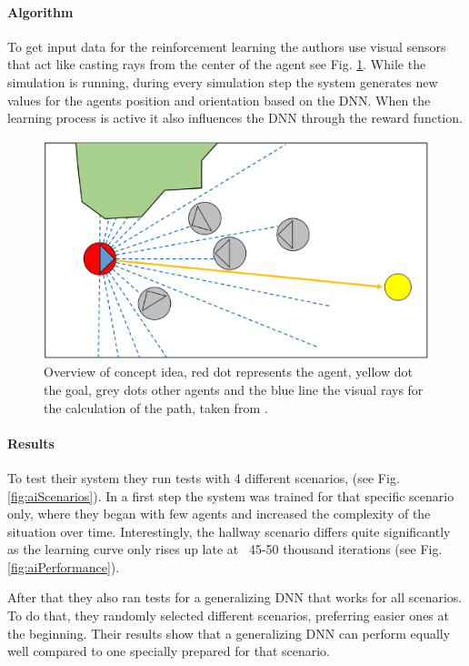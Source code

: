 \documentclass{acmsiggraph}               %
\begin{document}
\paragraph{Algorithm}
To get input data for the reinforcement learning the authors use visual sensors that act like casting rays from the center of the agent see Fig. \ref{fig:aiConceptOverview}. While the simulation is running, during every simulation step the system generates new values for the agents position and orientation based on the DNN. When the learning process is active it also influences the DNN through the reward function.
\begin{figure}[h]
  \centering
  \includegraphics[width=1\linewidth]{images/aiAlgortihmn.png}
  \caption{Overview of concept idea, red dot represents the agent, yellow dot the goal, grey dots other agents and the blue line the visual rays for the calculation of the path, taken from \protect\cite{lee_crowd_2018}.}
  \label{fig:aiConceptOverview}
\end{figure}

\paragraph{Results}
To test their system they run tests with 4 different scenarios, (see Fig. \ref{fig:aiScenarios}). In a first step the system was trained for that specific scenario only, where they began with few agents and increased the complexity of the situation over time. Interestingly, the hallway scenario differs quite significantly as the learning curve only rises up late at ~45-50 thousand iterations (see Fig. \ref{fig:aiPerformance}).

After that they also ran tests for a generalizing DNN that works for all scenarios. To do that, they randomly selected different scenarios, preferring easier ones at the beginning. Their results show that a generalizing DNN can perform equally well compared to one specially prepared for that scenario. 
\end{document}
